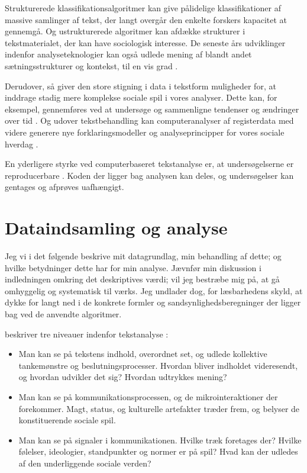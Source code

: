 Strukturerede klassifikationsalgoritmer kan give pålidelige klassifikationer af massive samlinger af tekst, der langt overgår den enkelte forskers kapacitet at gennemgå.
Og ustrukturerede algoritmer kan afdække strukturer i tekstmaterialet, der kan have sociologisk interesse.
De seneste års udviklinger indenfor analyseteknologier kan også udlede mening af blandt andet sætningsstrukturer og kontekst, til en vis grad
\autocite[s. 22]{evansMachineTranslationMining2016}.

Derudover, så giver den store stigning i data i tekstform muligheder for, at inddrage stadig mere komplekse sociale spil i vores analyser.
Dette kan, for eksempel, gennemføres ved at undersøge og sammenligne tendenser og ændringer over tid \autocite{evansMachineTranslationMining2016}.
Og udover tekstbehandling kan computeranalyser af registerdata med videre generere nye forklaringsmodeller og analyseprincipper for vores sociale hverdag \autocite{evansComputationSociologicalImagination2019}.

En yderligere styrke ved computerbaseret tekstanalyse er, at undersøgelserne er reproducerbare \autocite[s. 13]{kwartlerTextMiningPractice2017}.
Koden der ligger bag analysen kan deles, og undersøgelser kan gentages og afprøves uafhængigt.

\chapter{Dataindsamling og analyse}\label{chap:data}

Jeg vi i det følgende beskrive mit datagrundlag, min behandling af dette; og hvilke betydninger dette har for min analyse.
Jævnfør min diskussion i indledningen omkring det deskriptives værdi; vil jeg bestræbe mig på, at gå omhyggelig og systematisk til værks.
Jeg undlader dog, for læsbarhedens skyld, at dykke for langt ned i de konkrete formler og sandsynlighedsberegninger der ligger bag ved de anvendte algoritmer.

\citeauthor{evansMachineTranslationMining2016} beskriver tre niveauer indenfor tekstanalyse \autocite[s. 34]{evansMachineTranslationMining2016}:
\begin{itemize}
  \item
    Man kan se på tekstens indhold, overordnet set, og udlede kollektive tankemønstre og beslutningsprocesser.
    Hvordan bliver indholdet videresendt, og hvordan udvikler det sig?
    Hvordan udtrykkes mening?
  \item
    Man kan se på kommunikationsprocessen, og de mikrointeraktioner der forekommer.
    Magt, status, og kulturelle artefakter træder frem, og belyser de konstituerende sociale spil.
  \item
    Man kan se på signaler i kommunikationen.
    Hvilke træk foretages der?
    Hvilke følelser, ideologier, standpunkter og normer er på spil?
    Hvad kan der udledes af den underliggende sociale verden?
\end{itemize}

